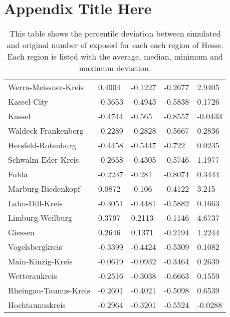 
\chapter{Appendix Title Here} %
\label{AppendixA} %

\begin{table}
	\caption{This table shows the percentile deviation between simulated and original number of exposed for each each region of Hesse.
		Each region is listed with the average, median, minimum and maximum deviation.}
	\begin{tabular}{|l||x{2cm}|x{2cm}|x{2cm}|x{2cm}|}
		\hline 
		 &  &  &  &  \\ \hline\hline
		Werra-Meissner-Kreis & 0.4004 & -0.1227 & -0.2677 & 2.9405 \\ \hline
		Kassel-City & -0.3653 & -0.4943 & -0.5838 & 0.1726 \\ \hline
		Kassel & -0.4744 & -0.565 & -0.8557 & -0.0433 \\ \hline
		Waldeck-Frankenberg & -0.2289 & -0.2828 & -0.5667 & 0.2836 \\ \hline
		Hersfeld-Rotenburg & -0.4458 & -0.5447 & -0.722 & 0.0235 \\ \hline
		Schwalm-Eder-Kreis & -0.2658 & -0.4305 & -0.5746 & 1.1977 \\ \hline
		Fulda & -0.2237 & -0.281 & -0.8074 & 0.3444 \\ \hline
		Marburg-Biedenkopf & 0.0872 & -0.106 & -0.4122 & 3.215 \\ \hline
		Lahn-Dill-Kreis & -0.3051 & -0.4481 & -0.5882 & 0.1663 \\ \hline
		Limburg-Weilburg & 0.3797 & 0.2113 & -0.1146 & 4.6737 \\ \hline
		Giessen & 0.2646 & 0.1371 & -0.2194 & 1.2244 \\ \hline
		Vogelsbergkreis & -0.3399 & -0.4424 & -0.5309 & 0.1082 \\ \hline
		Main-Kinzig-Kreis & -0.0619 & -0.0932 & -0.3464 & 0.2639 \\ \hline
		Wetteraukreis & -0.2516 & -0.3038 & -0.6663 & 0.1559 \\ \hline
		Rheingau-Taunus-Kreis & -0.2601 & -0.4021 & -0.5098 & 0.6539 \\ \hline
		Hochtaunuskreis & -0.2964 & -0.3201 & -0.5524 & -0.0288 \\ \hline

\end{tabular}
\end{table}
